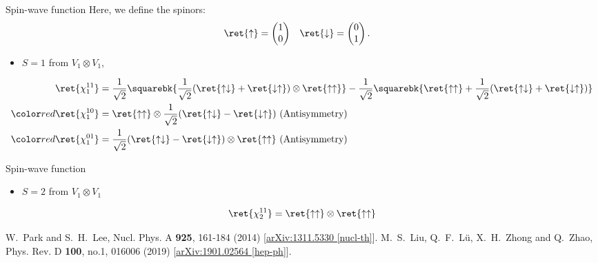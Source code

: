 \begin{frame}{Spin-wave function}
    Here, we define the spinors:
    \begin{align}
        \ret{\uparrow}             & =
        \begin{pmatrix}
            1 \\
                0
        \end{pmatrix} &
        \ret{\downarrow}           & =
        \begin{pmatrix}
            0 \\
            1
        \end{pmatrix}.
    \end{align}
    \begin{itemize}
        \item $S=1$ from $V_{1}\otimes V_{1}$, 
    \end{itemize}
    \begin{align}
        \ret{\chi^{11}_{1}}           & = \frac{1}{\sqrt{2}}\squarebk{\frac{1}{\sqrt{2}}(\ret{\uparrow\downarrow}+\ret{\downarrow\uparrow})\otimes\ret{\uparrow\uparrow}}-\frac{1}{\sqrt{2}}\squarebk{\ret{\uparrow\uparrow}+\frac{1}{\sqrt{2}}(\ret{\uparrow\downarrow}+\ret{\downarrow\uparrow})} \\
        \redtext{\ret{\chi^{10}_{1}}} & = \ret{\uparrow\uparrow}\otimes\frac{1}{\sqrt{2}}(\ret{\uparrow\downarrow}-\ret{\downarrow\uparrow})\ (\text{Antisymmetry})      \\
        \redtext{\ret{\chi^{01}_{1}}} & = \frac{1}{\sqrt{2}}(\ret{\uparrow\downarrow}-\ret{\downarrow\uparrow})\otimes\ret{\uparrow\uparrow}\ (\text{Antisymmetry})
    \end{align}
\end{frame}
\begin{frame}{Spin-wave function}
    \begin{itemize}
        \item $S=2$ from $V_{1}\otimes V_{1}$
    \end{itemize}
    \begin{equation}
        \ret{\chi^{11}_{2}} = \ret{\uparrow\uparrow}\otimes\ret{\uparrow\uparrow}
    \end{equation}
    \begin{thebibliography}
        \beamertemplatetextbibitems
        W.~Park and S.~H.~Lee,
        Nucl. Phys. A \textbf{925}, 161-184 (2014)
        [\href{https://arxiv.org/abs/1311.5330}{arXiv:1311.5330 [nucl-th]}].
    M.~S.~Liu, Q.~F.~L\"u, X.~H.~Zhong and Q.~Zhao,
    Phys. Rev. D \textbf{100}, no.1, 016006 (2019)
    [\href{https://arxiv.org/abs/1901.02564v4}{arXiv:1901.02564 [hep-ph]}].
    \end{thebibliography}
\end{frame}
